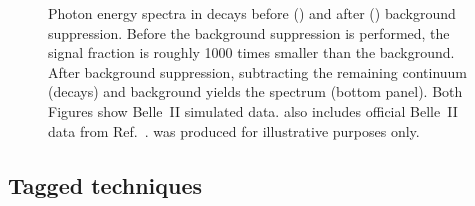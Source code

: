 \begin{figure}[htbp!]
    \centering
    \caption{\label{fig:untagged_btosgamma}
    Photon energy spectra in \BtoXsgamma decays before () and after () background suppression.
    Before the background suppression is performed, the signal fraction is roughly 1000 times smaller than the background.
    After background suppression, subtracting the remaining continuum (\epem\ra\qqbar decays) and \BB background yields the \BtoXsgamma spectrum (bottom panel).
    Both Figures show Belle~II simulated data.
     also includes official Belle~II data from Ref.~\cite{Collaboration:2302}.
     was produced for illustrative purposes only. 
    }
\end{figure}

\subsection{Tagged techniques}\label{sec:had_tagged_overview}

